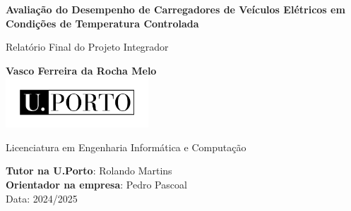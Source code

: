 \documentclass[10pt]{article}
\begin{document}
\begin{titlepage}
	\begin{center}
		\vspace*{1cm}
		
    {\fontsize{17}{16}\selectfont \textbf{Avaliação do Desempenho de Carregadores de Veículos Elétricos em Condições de Temperatura Controlada}}
     
		
		\vspace{0.5cm}
		Relatório Final do Projeto Integrador
		
		\vspace{1.5cm}
		
		\textbf{Vasco Ferreira da Rocha Melo}\\
		
		\vfill
		\includegraphics[width=0.4\textwidth]{UPORTO_fundotransparente}
		
		\vfill
		
	
		
		Licenciatura em Engenharia Informática e Computação
		
		\vspace{0.8cm}
		
		\textbf{Tutor na U.Porto}: Rolando Martins\\
		\textbf{Orientador na empresa}: Pedro Pascoal \\ %

\vspace{0.4cm}
		Data: 2024/2025
		
	\end{center}
\end{titlepage}


\thispagestyle{empty} 
\clearpage

\thispagestyle{empty}
\tableofcontents

 \clearpage


% 











 

 
\end{document}
